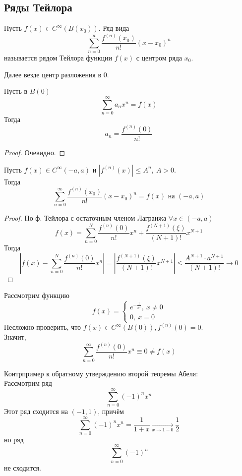 \subsection{Ряды Тейлора}
\begin{definition}
    Пусть $f(x) \in C^\infty(B(x_0))$. Ряд вида
    \[\sum_{n=0}^{\infty}\frac{f^{(n)}(x_0)}{n!}(x-x_0)^n\]
    называется рядом Тейлора функции $f(x)$ с центром ряда $x_0$.
\end{definition}
\begin{comm}
    Далее везде центр разложения в 0.
\end{comm}
\begin{theorem}
    Пусть в $B(0)$
    \[\sum_{n=0}^{\infty}a_n x^n = f(x)\]
    Тогда
    \[a_n = \frac{f^{(n)}(0)}{n!}\]
\end{theorem}
\begin{proof}
    Очевидно.
\end{proof}
\begin{theorem}
    Пусть $f(x) \in C^\infty(-a, a)$ и $|f^{(n)}(x)| \leqslant A^n, \ A > 0$.\\
    Тогда
    \[\sum_{n=0}^{\infty}\frac{f^{(n)}(x_0)}{n!}(x-x_0)^n = f(x) \text{ на } (-a, a)\]
\end{theorem}
\begin{proof}
    По ф. Тейлора с остаточным членом Лагранжа $\forall x \in (-a, a)$
    \[f(x) = \sum_{n=0}^{N}\frac{f^{(n)}(0)}{n!}x^n + \frac{f^{(N+1)}(\xi)}{(N+1)!}x^{N+1}\]
    Тогда
    \[\left| f(x) - \sum_{n=0}^{N}\frac{f^{(n)}(0)}{n!}x^n \right| = \left| \frac{f^{(N+1)}(\xi)}{(N+1)!}x^{N+1}\right| \leqslant \frac{A^{N+1}\cdot a^{N+1}}{(N+1)!} \rightarrow 0\]
\end{proof}
\begin{example}
    Рассмотрим функцию 
    \[f(x) = \begin{cases}
        e^{-\frac{1}{x^2}}, \ x \neq 0\\
        0, \ x = 0
    \end{cases}\]
    Несложно проверить, что $f(x) \in C^\infty(B(0)), f^{(n)}(0) = 0$.\\
    Значит,
    \[\sum_{n=0}^{\infty}\frac{f^{(n)}(0)}{n!}x^n \equiv 0 \neq f(x)\] 
\end{example}
\begin{example}
    Контрпример к обратному утверждению второй теоремы Абеля:\\
    Рассмотрим ряд
    \[\sum_{n=0}^{\infty}(-1)^nx^n\]
    Этот ряд сходится на $(-1, 1)$, причём
    \[\sum_{n=0}^{\infty}(-1)^nx^n = \frac{1}{1+x} \underset{x\rightarrow1-0}{\longrightarrow} \frac{1}{2}\]
    но ряд
    \[\sum_{n=0}^{\infty}(-1)^n\]
    не сходится.
\end{example}

